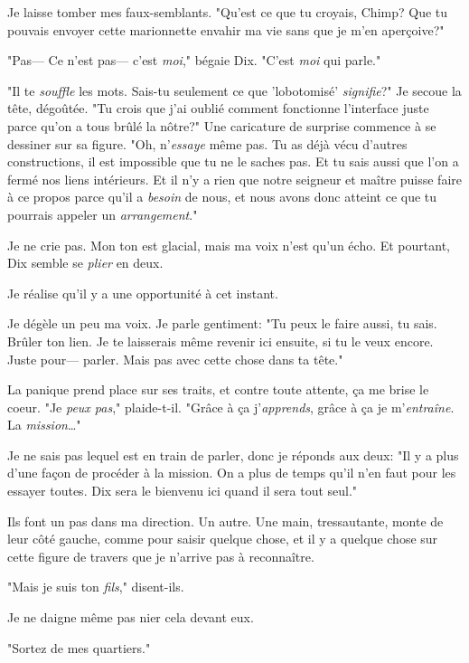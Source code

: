 Je laisse tomber mes faux-semblants. "Qu'est ce que tu croyais, Chimp? Que tu pouvais envoyer cette marionnette envahir ma vie sans que je m'en aperçoive?"

"Pas— Ce n'est pas— c'est \emph{moi}," bégaie Dix. "C’est \emph{moi} qui parle."

"Il te \emph{souffle} les mots. Sais-tu seulement ce que 'lobotomisé' \emph{signifie}?" Je secoue la tête, dégoûtée. "Tu crois que j'ai oublié comment fonctionne l'interface juste parce qu'on a tous brûlé la nôtre?" Une caricature de surprise commence à se dessiner sur sa figure. "Oh, n'\emph{essaye} même pas. Tu as déjà vécu d'autres constructions, il est impossible que tu ne le saches pas. Et tu sais aussi que l'on a fermé nos liens intérieurs. Et il n'y a rien que notre seigneur et maître puisse faire à ce propos parce qu'il a \emph{besoin} de nous, et nous avons donc atteint ce que tu pourrais appeler un \emph{arrangement}."

Je ne crie pas. Mon ton est glacial, mais ma voix n'est qu'un écho. Et pourtant, Dix semble se \emph{plier} en deux.

Je réalise qu'il y a une opportunité à cet instant.

Je dégèle un peu ma voix. Je parle gentiment: "Tu peux le faire aussi, tu sais. Brûler ton lien. Je te laisserais même revenir ici ensuite, si tu le veux encore. Juste pour— parler. Mais pas avec cette chose dans ta tête."

La panique prend place sur ses traits, et contre toute attente, ça me brise le coeur. "Je \emph{peux pas}," plaide-t-il. "Grâce à ça j'\emph{apprends}, grâce à ça je m'\emph{entraîne}. La \emph{mission}\ldots"

Je ne sais pas lequel est en train de parler, donc je réponds aux deux: "Il y a plus d'une façon de procéder à la mission. On a plus de temps qu'il n'en faut pour les essayer toutes. Dix sera le bienvenu ici quand il sera tout seul."

Ils font un pas dans ma direction. Un autre. Une main, tressautante, monte de leur côté gauche, comme pour saisir quelque chose, et il y a quelque chose sur cette figure de travers que je n'arrive pas à reconnaître.

"Mais je suis ton \emph{fils}," disent-ils.

Je ne daigne même pas nier cela devant eux.

"Sortez de mes quartiers."